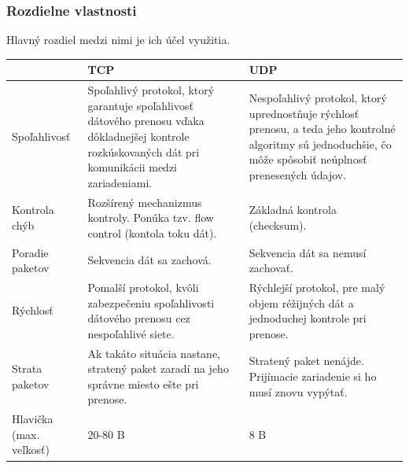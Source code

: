 \documentclass[12pt]{article}
\begin{document}
\subsubsection*{Rozdielne vlastnosti}
Hlavný rozdiel medzi nimi je ich účel využitia.
\begin{center}
        \begin{tabular}{ | p{3cm} | p{5cm} | p{5cm} | }
        \hline
         & TCP & UDP \\ \hline

        Spoľahlivosť & 
        Spoľahlivý protokol, ktorý garantuje spoľahlivosť dátového prenosu vďaka dôkladnejšej 
        kontrole rozkúskovaných dát pri komunikácii medzi zariadeniami. & 
        Nespoľahlivý protokol, ktorý uprednostňuje rýchlosť prenosu, a teda jeho kontrolné 
        algoritmy sú jednoduchšie, čo môže spôsobiť neúplnosť prenesených údajov. \\ \hline

        Kontrola chýb & 
        Rozšírený mechanizmus kontroly. Ponúka tzv. flow control (kontola toku dát). & 
        Základná kontrola (checksum). \\ \hline

        Poradie paketov & 
        Sekvencia dát sa zachová. & 
        Sekvencia dát sa nemusí zachovať. \\ \hline

        Rýchlosť & 
        Pomalší protokol, kvôli zabezpečeniu spoľahlivosti dátového prenosu cez nespoľahlivé 
        siete. & 
        Rýchlejší protokol, pre malý objem réžijných dát a jednoduchej kontrole pri prenose. 
        \\ \hline

        Strata paketov & 
        Ak takáto situácia nastane, stratený paket zaradí na jeho správne miesto ešte pri 
        prenose. & 
        Stratený paket nenájde. Prijímacie zariadenie si ho musí znovu vypýtať. \\ \hline

        Hlavička (max. veľkosť) & 
        20-80 B & 
        8 B \\ \hline
        \end{tabular}
\end{center}


\newpage
\end{document}
